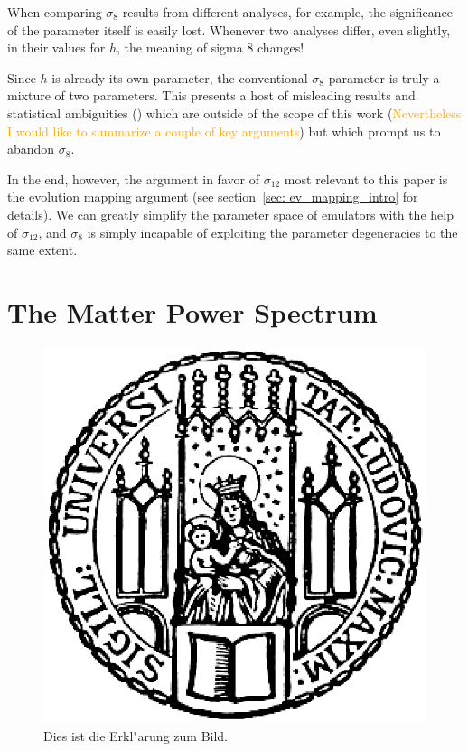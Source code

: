 
When comparing $\sigma_8$ results from different analyses, for example, the significance of the parameter itself is easily lost. Whenever two analyses differ, even slightly, in their values for $h$, the meaning of sigma 8 changes!

Since $h$ is already its own parameter, the conventional $\sigma_8$ parameter 
is truly a mixture of two parameters. This presents a host of misleading 
results and statistical ambiguities () which are outside of the 
scope of this work (\textcolor{orange}{Nevertheless I would like to summarize 
a couple of key arguments}) but which prompt us to abandon $\sigma_8$.

In the end, however, the argument in favor of $\sigma_{12}$ most relevant to
this paper is the evolution mapping argument
(see section~\ref{sec: ev_mapping_intro} for details). We can greatly simplify 
the
parameter space of emulators with the help of $\sigma_{12}$, and $\sigma_8$
is simply incapable of exploiting the parameter degeneracies to the same
extent.
 

\section{The Matter Power Spectrum}
\label{sec: Pk_intro}


\begin{figure}[htb]
  \centering
  \includegraphics[scale=0.5]{siegel}
  \caption[Kurzform f"ur das Abbildungsverzeichnis]{Dies ist die Erkl"arung zum Bild.}
\end{figure}


